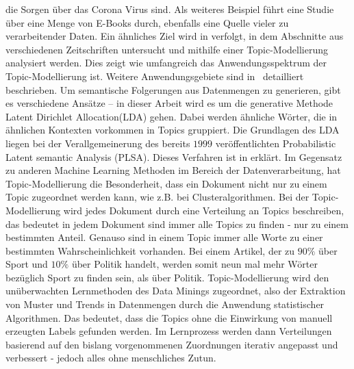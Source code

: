 \documentclass[german,version-2020-11]{uzl-thesis}
\begin{document}
die Sorgen über das Corona Virus sind. Als weiteres Beispiel führt \cite{t1} eine Studie über eine Menge von E-Books durch, ebenfalls eine Quelle vieler zu verarbeitender Daten. Ein ähnliches Ziel wird in \cite{t3} verfolgt, in dem Abschnitte aus verschiedenen Zeitschriften untersucht und mithilfe einer Topic-Modellierung  analysiert werden. Dies zeigt wie umfangreich das Anwendungsspektrum der Topic-Modellierung ist. Weitere Anwendungsgebiete sind in \cite{tmbook} detailliert beschrieben. Um semantische Folgerungen aus Datenmengen zu generieren, gibt es verschiedene Ansätze – in dieser Arbeit wird es um die generative Methode Latent Dirichlet Allocation(LDA) gehen. Dabei werden ähnliche Wörter, die in ähnlichen Kontexten vorkommen in Topics gruppiert. Die Grundlagen des LDA liegen bei der Verallgemeinerung des bereits $1999$ veröffentlichten Probabilistic Latent semantic Analysis (PLSA). Dieses Verfahren ist in \cite{plsa} erklärt. Im Gegensatz zu anderen Machine Learning Methoden im Bereich der Datenverarbeitung, hat Topic-Modellierung die Besonderheit, dass ein Dokument nicht nur zu einem Topic zugeordnet werden kann, wie z.B. bei Clusteralgorithmen. Bei der Topic-Modellierung wird jedes Dokument durch eine Verteilung an Topics beschreiben, das bedeutet in jedem Dokument sind immer alle Topics zu finden - nur zu einem bestimmten Anteil. Genauso sind in einem Topic immer alle Worte zu einer bestimmten Wahrscheinlichkeit vorhanden. Bei einem Artikel, der zu $90\%$ über Sport und $10\%$ über Politik handelt, werden somit neun mal mehr Wörter bezüglich Sport zu finden sein, als über Politik. Topic-Modellierung wird den unüberwachten Lernmethoden des Data Minings zugeordnet, also der Extraktion von Muster und Trends in Datenmengen durch die Anwendung statistischer Algorithmen. Das bedeutet, dass die Topics ohne die Einwirkung von manuell erzeugten Labels gefunden werden. Im Lernprozess werden dann Verteilungen basierend auf den bislang vorgenommenen Zuordnungen iterativ angepasst und verbessert - jedoch alles ohne menschliches Zutun. 
\end{document}

